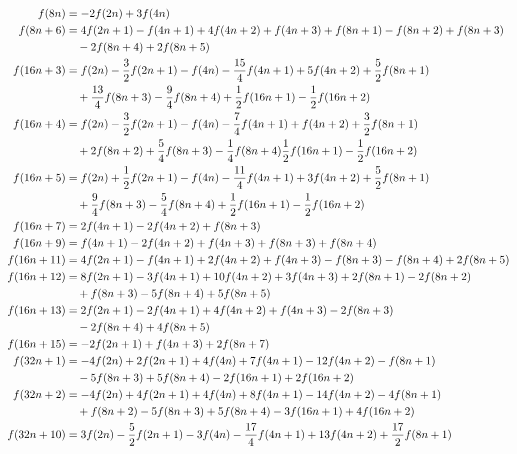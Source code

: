 \documentclass[11pt,reqno]{amsart}
\numberwithin{equation}{section}
\theoremstyle{plain}
\theoremstyle{definition}
\theoremstyle{remark}
\begin{document}
\begin{align*}
f(8n) &= -2  f(2n) + 3 f(4n) \\
f(8n+6) &= 4  f(2n+1) -  f(4n+1) + 4 f(4n+2) + f(4n+3) + f(8n+1) - f(8n+2) +  f(8n+3) \\
& \quad - 2 f(8n+4) + 2 f(8n+5) \\
f(16n+3) &= f(2n) - {3 \over 2}  f(2n+1) - f(4n) - {{15} \over 4} f(4n+1) +  5 f(4n+2) +  {5 \over 2} f(8n+1) \\
& \quad + {{13} \over 4}   f(8n+3) - {9 \over 4}  f(8n+4) + {1 \over 2}    f(16n+1) - {1 \over 2}  f(16n+2) \\
f(16n+4) &= f(2n) -{3 \over 2}  f(2n+1) - f(4n) -{7 \over 4}  f(4n+1) +  f(4n+2) + {3 \over 2}  f(8n+1)  \\
& \quad + 2  f(8n+2) + {5 \over 4}  f(8n+3) - {1 \over 4} f(8n+4) {1 \over 2}  f(16n+1) -{1 \over 2}  f(16n+2) \\
f(16n+5) &=  f(2n) + {1 \over 2}  f(2n+1) - f(4n) -{{11}\over 4} f(4n+1) + 3  f(4n+2) + {5 \over 2}  f(8n+1) \\
& \quad + {9 \over 4}   f(8n+3) -{5 \over 4}  f(8n+4) + {1 \over 2}  f(16n+1) -{1 \over 2}  f(16n+2) \\
f(16n+7) &= 2 f(4n+1) -2 f(4n+2) + f(8n+3) \\
f(16n+9) &= f(4n+1) -2 f(4n+2) + f(4n+3) + f(8n+3) +  f(8n+4) \\
f(16n+11) &= 4  f(2n+1) -  f(4n+1) +2  f(4n+2) +  f(4n+3) -  f(8n+3) - f(8n+4) +2  f(8n+5) \\
f(16n+12) &= 8  f(2n+1) -3  f(4n+1) +10  f(4n+2) +3  f(4n+3) +2  f(8n+1) -2   f(8n+2) \\
& \quad +  f(8n+3) -5   f(8n+4) +5  f(8n+5) \\
f(16n+13) &= 2  f(2n+1) -2  f(4n+1) +4 f(4n+2) +  f(4n+3) -2  f(8n+3)  \\
& \quad -2  f(8n+4) +4  f(8n+5) \\
f(16n+15) &= -2  f(2n+1) +  f(4n+3) +2  f(8n+7) \\
f(32n+1) &= -4  f(2n) +2  f(2n+1) +4  f(4n) +7 f(4n+1) -12  f(4n+2) -  f(8n+1) 
\\
& \quad -5  f(8n+3) +5  f(8n+4) -2  f(16n+1) +2  f(16n+2)  \\
f(32n+2) &= -4  f(2n) +4  f(2n+1) +4  f(4n) +8  f(4n+1) -14  f(4n+2)  - 4  f(8n+1) \\
& \quad +  f(8n+2) -5   f(8n+3) +5  f(8n+4) -3  f(16n+1) +4  f(16n+2) \\
f(32n+10) &= 3  f(2n) -{5 \over 2}    f(2n+1) -3  f(4n) -{{17} \over 4}  f(4n+1) +13  f(4n+2) +{{17} \over 2}  f(8n+1) \\

\end{align*}
\end{document}
